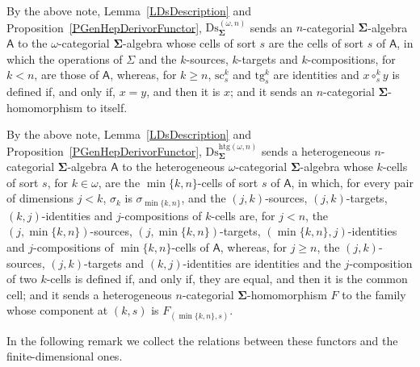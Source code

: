 \documentclass[a4paper, reqno]{amsbook}
\newcommand{\sig}[1]{\mathbf{#1}}             %
\newcommand{\calg}[1]{\boldsymbol{\mathsf{#1}}} %
\newcommand{\htg}{\mathrm{htg}}                %
\newcommand{\src}{\mathrm{sc}}
\newcommand{\tgt}{\mathrm{tg}}
\newcommand{\Ds}{\mathrm{Ds}}
\theoremstyle{plain}
\theoremstyle{definition}
\begin{document}
By the above note, Lemma~\ref{LDsDescription} and Proposition~\ref{PGenHepDerivorFunctor}, $\Ds^{(\omega,n)}_{\sig{\Sigma}}$ sends an $n$-categorial $\sig{\Sigma}$-algebra $\calg{A}$ to the $\omega$-categorial $\sig{\Sigma}$-algebra whose cells of sort $s$ are the cells of sort $s$ of $\calg{A}$, in which the operations of $\Sigma$ and the $k$-sources, $k$-targets and $k$-compositions, for $k<n$, are those of $\calg{A}$, whereas, for $k\geq n$, $\src^{k}_{s}$ and $\tgt^{k}_{s}$ are identities and $x\circ^{k}_{s}y$ is defined if, and only if, $x=y$, and then it is $x$; and it sends an $n$-categorial $\sig{\Sigma}$-homomorphism to itself.

By the above note, Lemma~\ref{LDsDescription} and Proposition~\ref{PGenHepDerivorFunctor}, $\Ds^{\htg(\omega,n)}_{\sig{\Sigma}}$ sends a heterogeneous $n$-categorial $\sig{\Sigma}$-algebra $\calg{A}$ to the heterogeneous $\omega$-categorial $\sig{\Sigma}$-algebra whose $k$-cells of sort $s$, for $k\in\omega$, are the $\min\{k,n\}$-cells of sort $s$ of $\calg{A}$, in which, for every pair of dimensions $j<k$, $\sigma_{k}$ is $\sigma_{\min\{k,n\}}$, and the $(j,k)$-sources, $(j,k)$-targets, $(k,j)$-identities and $j$-compositions of $k$-cells are, for $j<n$, the $(j,\min\{k,n\})$-sources, $(j,\min\{k,n\})$-targets, $(\min\{k,n\},j)$-identities and $j$-compositions of $\min\{k,n\}$-cells of $\calg{A}$, whereas, for $j\geq n$, the $(j,k)$-sources, $(j,k)$-targets and $(k,j)$-identities are identities and the $j$-composition of two $k$-cells is defined if, and only if, they are equal, and then it is the common cell; and it sends a heterogeneous $n$-categorial $\sig{\Sigma}$-homomorphism $F$ to the family whose component at $(k,s)$ is $F_{(\min\{k,n\},s)}$.

In the following remark we collect the relations between these functors and the finite-dimensional ones.
\end{document}
